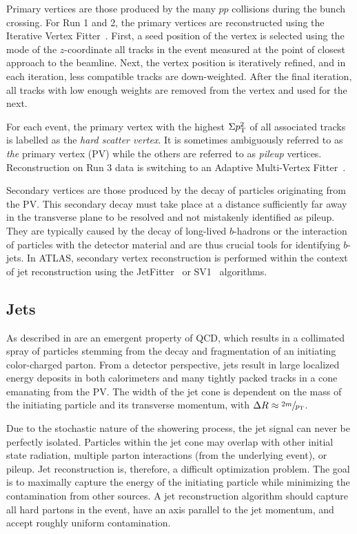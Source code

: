 Primary vertices are those produced by the many $pp$ collisions during the bunch crossing.
For Run 1 and 2, the primary vertices are reconstructed using the Iterative Vertex Fitter~\cite{ATLASVertex}.
First, a seed position of the vertex is selected using the mode of the $z$-coordinate all tracks in the event measured at the point of closest approach to the beamline.
Next, the vertex position is iteratively refined, and in each iteration, less compatible tracks are down-weighted.
After the final iteration, all tracks with low enough weights are removed from the vertex and used for the next.

For each event, the primary vertex with the highest $\Sigma p_\mathrm{T}^2$ of all associated tracks is labelled as the \textit{hard scatter vertex}.
It is sometimes ambiguously referred to as \textit{the} primary vertex (PV) while the others are referred to as \textit{pileup} vertices.
Reconstruction on Run 3 data is switching to an Adaptive Multi-Vertex Fitter~\cite{Run3Vertex}.

Secondary vertices are those produced by the decay of particles originating from the PV.
This secondary decay must take place at a distance sufficiently far away in the transverse plane to be resolved and not mistakenly identified as pileup.
They are typically caused by the decay of long-lived $b$-hadrons or the interaction of particles with the detector material and are thus crucial tools for identifying $b$-jets.
In ATLAS, secondary vertex reconstruction is performed within the context of jet reconstruction using the JetFitter~\cite{JetFitter} or SV1~\cite{SV1} algorithms.

\subsection{Jets}
\label{sec:jets_reconstruction}

As described in  are an emergent property of QCD\@, which results in a collimated spray of particles stemming from the decay and fragmentation of an initiating color-charged parton.
From a detector perspective, jets result in large localized energy deposits in both calorimeters and many tightly packed tracks in a cone emanating from the PV.
The width of the jet cone is dependent on the mass of the initiating particle and its transverse momentum, with $\Delta R \approx \sfrac{2m}{p_\mathrm{T}}$.

Due to the stochastic nature of the showering process, the jet signal can never be perfectly isolated.
Particles within the jet cone may overlap with other initial state radiation, multiple parton interactions (from the underlying event), or pileup.
Jet reconstruction is, therefore, a difficult optimization problem.
The goal is to maximally capture the energy of the initiating particle while minimizing the contamination from other sources.
A jet reconstruction algorithm should capture all hard partons in the event, have an axis parallel to the jet momentum, and accept roughly uniform contamination.

